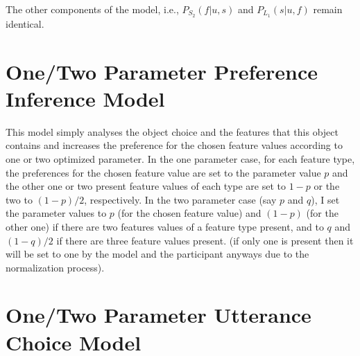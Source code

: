\documentclass[10pt,a4paper]{article}
\begin{document}
The other components of the model, i.e., $P_{S_{2}}(f|u,s)$ and $P_{L_{1}}(s|u,f)$ remain identical. 


\section{One/Two Parameter Preference Inference Model}
This model simply analyses the object choice and the features that this object contains and increases the 
preference for the chosen feature values according to one or two optimized parameter.
In the one parameter case, for each feature type, the preferences for the chosen feature value are set to the parameter value $p$ and the other one or two present feature values of each type are set to $1-p$ or the two to $(1-p)/2$, respectively.
In the two parameter case (say $p$ and $q$), I set the parameter values to $p$ (for the chosen feature value) and $(1-p)$ (for the other one) if there are two features values of a feature type present, and to $q$ and $(1-q)/2$ if there are three feature values present. (if only one is present then it will be set to one by the model and the participant anyways due to the normalization process).



\section{One/Two Parameter Utterance Choice Model}




\setlength{\bibleftmargin}{.125in}
\setlength{\bibindent}{-\bibleftmargin}


\end{document}
